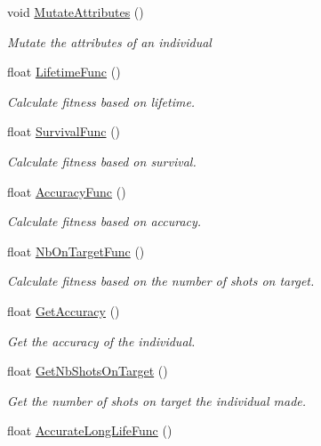 \begin{DoxyCompactItemize}
void \mbox{\hyperlink{class_individual_a2b19324cd6e712330c4d1601c95dcffd}{Mutate\+Attributes}} ()
\begin{DoxyCompactList}\small\item\em Mutate the attributes of an individual \end{DoxyCompactList}\item 
float \mbox{\hyperlink{class_individual_af40ad69dad043da7061c07856b6f1457}{Lifetime\+Func}} ()
\begin{DoxyCompactList}\small\item\em Calculate fitness based on lifetime. \end{DoxyCompactList}\item 
float \mbox{\hyperlink{class_individual_abf304201269d32a0f40d9a25ce98d8db}{Survival\+Func}} ()
\begin{DoxyCompactList}\small\item\em Calculate fitness based on survival. \end{DoxyCompactList}\item 
float \mbox{\hyperlink{class_individual_ae29881ad8bfa0ec8db58c650ac33eaf0}{Accuracy\+Func}} ()
\begin{DoxyCompactList}\small\item\em Calculate fitness based on accuracy. \end{DoxyCompactList}\item 
float \mbox{\hyperlink{class_individual_af2d68c02add2e5e553959003e8180a9d}{Nb\+On\+Target\+Func}} ()
\begin{DoxyCompactList}\small\item\em Calculate fitness based on the number of shots on target. \end{DoxyCompactList}\item 
float \mbox{\hyperlink{class_individual_a5d4fb02c8072b931ffde1a03afb26271}{Get\+Accuracy}} ()
\begin{DoxyCompactList}\small\item\em Get the accuracy of the individual. \end{DoxyCompactList}\item 
float \mbox{\hyperlink{class_individual_a100f431028b5b9d385348fdb000e3b32}{Get\+Nb\+Shots\+On\+Target}} ()
\begin{DoxyCompactList}\small\item\em Get the number of shots on target the individual made. \end{DoxyCompactList}\item 
float \mbox{\hyperlink{class_individual_ae28e091935420b6ab5ccda6ce24e1396}{Accurate\+Long\+Life\+Func}} ()

\end{DoxyCompactItemize}
